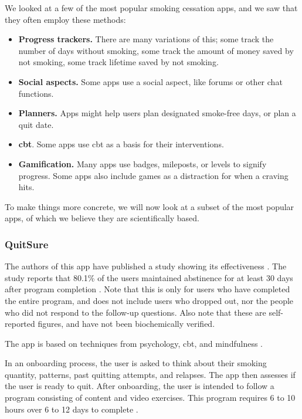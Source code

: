 We looked at a few of the most popular smoking cessation apps, and we saw that they often employ these methods:
\begin{itemize}
    \item \textbf{Progress trackers.} There are many variations of this; some track the number of days without smoking, some track the amount of money saved by not smoking, some track lifetime saved by not smoking.
    \item \textbf{Social aspects.} Some apps use a social aspect, like forums or other chat functions.
    \item \textbf{Planners.} Apps might help users plan designated smoke-free days, or plan a quit date.
    \item \textbf{\Ac{cbt}}. Some apps use \ac{cbt} as a basis for their interventions.
    \item \textbf{Gamification.} Many apps use badges, mileposts, or levels to signify progress. Some apps also include games as a distraction for when a craving hits.
\end{itemize}

To make things more concrete, we will now look at a subset of the most popular apps, of which we believe they are scientifically based.

\subsubsection{QuitSure}

The authors of this app have published a study showing its effectiveness \cite{BestQuitSmoking, goldgofEfficacyQuitSureApp2024}. The study reports that 80.1\% of the users maintained abstinence for at least 30 days after program completion \cite{goldgofEfficacyQuitSureApp2024}. Note that this is only for users who have completed the entire program, and does not include users who dropped out, nor the people who did not respond to the follow-up questions. Also note that these are self-reported figures, and have not been biochemically verified.

The app is based on techniques from psychology, \ac{cbt}, and mindfulness \cite{goldgofEfficacyQuitSureApp2024}.

In an onboarding process, the user is asked to think about their smoking quantity, patterns, past quitting attempts, and relapses. The app then assesses if the user is ready to quit. After onboarding, the user is intended to follow a program consisting of content and video exercises. This program requires 6 to 10 hours over 6 to 12 days to complete \cite{goldgofEfficacyQuitSureApp2024}.

